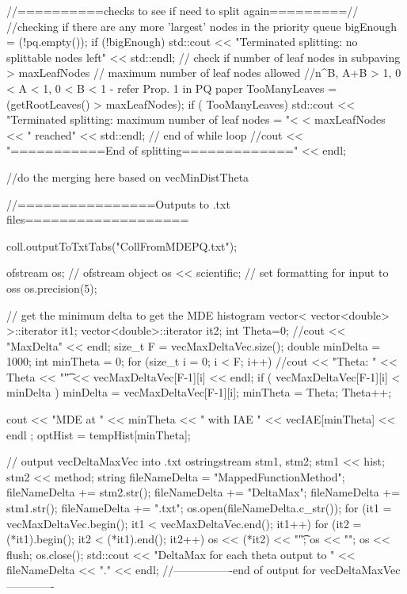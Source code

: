 \begin{DoxyCode}
{{{        //==========checks to see if need to split again=========//
            //checking if there are any more 'largest' nodes in the priority
       queue
            bigEnough = (!pq.empty());
            if (!bigEnough){    
          std::cout << "Terminated splitting: no splittable nodes left"
                    << std::endl;
            }
        // check if number of leaf nodes in subpaving > maxLeafNodes
        // maximum number of leaf nodes allowed
        //n^B, A+B > 1, 0  < A < 1, 0 < B < 1 - refer Prop. 1 in PQ paper
        TooManyLeaves = (getRootLeaves() > maxLeafNodes);
        if ( TooManyLeaves) {
          std::cout << "Terminated splitting: maximum number of leaf nodes = "<
      < maxLeafNodes << " reached"
                          << std::endl;
        }
      } // end of while loop
      //cout << "===========End of splitting=============" << endl;
        
      //do the merging here based on vecMinDistTheta
         
      //================Outputs to .txt files=================== 
      
      coll.outputToTxtTabs("CollFromMDEPQ.txt");
      
      ofstream os;         // ofstream object
      os << scientific;  // set formatting for input to oss
      os.precision(5);

       // get the minimum delta to get the MDE histogram
      vector< vector<double> >::iterator it1; 
      vector<double>::iterator it2;
      int Theta=0;
      //cout << "MaxDelta" << endl;
      size_t F = vecMaxDeltaVec.size(); 
      double minDelta = 1000;
      int minTheta = 0;
      for (size_t i = 0; i < F; i++){
        //cout << "Theta: " << Theta << "\t" << vecMaxDeltaVec[F-1][i] << endl;
        if ( vecMaxDeltaVec[F-1][i] < minDelta ) { 
          minDelta = vecMaxDeltaVec[F-1][i]; 
          minTheta = Theta; 
        } 
        Theta++;
      }

      cout << "MDE at " << minTheta << " with IAE " << vecIAE[minTheta] << endl
      ; 
         optHist = tempHist[minTheta];

      // output vecDeltaMaxVec into .txt 
      ostringstream stm1, stm2;
      stm1 << hist;
      stm2 << method;
      string fileNameDelta = "MappedFunctionMethod";
      fileNameDelta += stm2.str();
      fileNameDelta += "DeltaMax";
      fileNameDelta += stm1.str();
      fileNameDelta += ".txt";  
      os.open(fileNameDelta.c_str());
      for (it1 = vecMaxDeltaVec.begin(); it1 < vecMaxDeltaVec.end(); it1++){ 
        for (it2 = (*it1).begin(); it2 < (*it1).end(); it2++){
          os << (*it2) << "\t";
        }
        os << "\n";
      }          
      os << flush;
      os.close();
      std::cout << "DeltaMax for each theta output to " << fileNameDelta << "."
       << endl;
      //----------------end of output for vecDeltaMaxVec-------------
 
}}
\end{DoxyCode}
